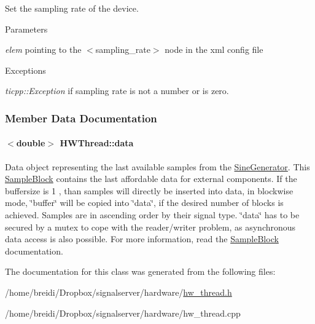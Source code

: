Set the sampling rate of the device. 
\begin{DoxyParams}{Parameters}
\item[{\em elem}]pointing to the $<$sampling\_\-rate$>$ node in the xml config file \end{DoxyParams}

\begin{DoxyExceptions}{Exceptions}
\item[{\em ticpp::Exception}]if sampling rate is not a number or is zero. \end{DoxyExceptions}


\subsubsection{Member Data Documentation}
\hypertarget{class_h_w_thread_a64aa44932b8914a5623aa2f1efd4e149}{
\paragraph[{data}]{$<$double$>$ {\bf HWThread::data}}\hfill}
\label{class_h_w_thread_a64aa44932b8914a5623aa2f1efd4e149}


Data object representing the last available samples from the \hyperlink{class_sine_generator}{SineGenerator}. This \hyperlink{class_sample_block}{SampleBlock} contains the last affordable data for external components. If the buffersize is 1 , than samples will directly be inserted into data, in blockwise mode, \char`\"{}buffer\char`\"{} will be copied into \char`\"{}data\char`\"{}, if the desired number of blocks is achieved. Samples are in ascending order by their signal type. \char`\"{}data\char`\"{} has to be secured by a mutex to cope with the reader/writer problem, as asynchronous data access is also possible. For more information, read the \hyperlink{class_sample_block}{SampleBlock} documentation. 

The documentation for this class was generated from the following files:\begin{DoxyCompactItemize}
\item 
/home/breidi/Dropbox/signalserver/hardware/\hyperlink{hw__thread_8h}{hw\_\-thread.h}\item 
/home/breidi/Dropbox/signalserver/hardware/hw\_\-thread.cpp\end{DoxyCompactItemize}
